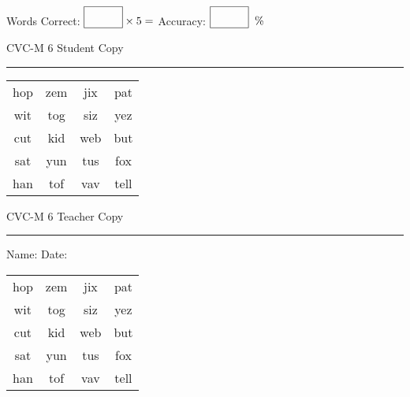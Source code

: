 \documentclass{memoir}
\begin{document}
\small

Words Correct: $\fbox{\phantom{\huge 100}} \times 5 = $ Accuracy: $\fbox{\phantom{\huge 100}}\;\; \%$ 

\vfill

\newpage


\footnotesize \noindent
CVC-M 6 \hfill Student Copy
\smallskip
\hrule

\Large

\setlength{\tabcolsep}{14pt}
\def\arraystretch{2}

{\selectfont


\begin{vplace}[0.5]
\begin{center}
\begin{tabular}{cccc}
hop & zem & jix & pat \\
wit & tog & siz & yez \\
cut & kid & web & but \\
sat & yun & tus & fox \\
han & tof & vav & tell \\
\end{tabular}
\end{center}
\end{vplace}

}

\newpage

\footnotesize \noindent
CVC-M 6 \hfill Teacher Copy
\smallskip
\hrule

\small

\vfill

\noindent
Name: \underline{\hspace{1.75in}} \hfill Date: \underline{\hspace{1in}}

\Large

{\selectfont


\begin{vplace}[0.5]
\begin{center}
\begin{tabular}{cccc}
hop & zem & jix & pat \\
wit & tog & siz & yez \\
cut & kid & web & but \\
sat & yun & tus & fox \\
han & tof & vav & tell \\
\end{tabular}
\end{center}
\end{vplace}



}
\end{document}
